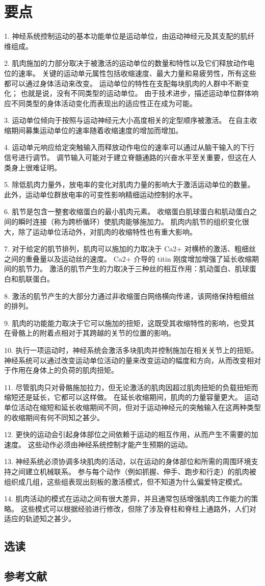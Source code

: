 \section{要点}
1. 神经系统控制运动的基本功能单位是运动单位，由运动神经元及其支配的肌纤维组成。 

2. 肌肉施加的力部分取决于被激活的运动单位的数量和特性以及它们释放动作电位的速率。 关键的运动单元属性包括收缩速度、最大力量和易疲劳性，所有这些都可以通过身体活动来改变。 运动单位的特性在支配每块肌肉的人群中不断变化； 也就是说，没有不同类型的运动单位。 由于技术进步，描述运动单位群体响应不同类型的身体活动变化而表现出的适应性正在成为可能。 

3. 运动单位倾向于按照与运动神经元大小高度相关的定型顺序被激活。 在自主收缩期间募集运动单位的速率随着收缩速度的增加而增加。 

4. 运动单元响应给定突触输入而释放动作电位的速率可以通过从脑干输入的下行信号进行调节。 调节输入可能对于建立脊髓通路的兴奋水平至关重要，但这在人类身上很难证明。 

5. 除低肌肉力量外，放电率的变化对肌肉力量的影响大于激活运动单位的数量。 此外，运动单位群放电率的可变性影响精细运动控制的水平。 

6. 肌节是包含一整套收缩蛋白的最小肌肉元素。 收缩蛋白肌球蛋白和肌动蛋白之间的瞬时连接（称为跨桥循环）使肌肉能够施加力。 肌肉内肌节的组织变化很大，除了运动单位活动外，对肌肉的收缩特性也有重大影响。 

7. 对于给定的肌节排列，肌肉可以施加的力取决于 Ca2+ 对横桥的激活、粗细丝之间的重叠量以及运动丝的速度。 Ca2+ 介导的 titin 刚度增加增强了延长收缩期间的肌节力。 激活的肌节产生的力取决于三种丝的相互作用：肌动蛋白、肌球蛋白和肌联蛋白。 

8. 激活的肌节产生的大部分力通过非收缩蛋白网络横向传递，该网络保持粗细丝的排列。 

9. 肌肉的功能能力取决于它可以施加的扭矩，这既受其收缩特性的影响，也受其在骨骼上的附着点相对于其跨越的关节的位置的影响。 

10. 执行一项运动时，神经系统会激活多块肌肉并控制施加在相关关节上的扭矩。 神经系统可以通过改变运动单位活动的量来改变运动的幅度和方向，从而改变相对于作用在身体上的负荷的肌肉扭矩。 

11. 尽管肌肉只对骨骼施加拉力，但无论激活的肌肉因超过肌肉扭矩的负载扭矩而缩短还是延长，它都可以这样做。 在延长收缩期间，肌肉的力量容量更大。 运动单位活动在缩短和延长收缩期间不同，但对于运动神经元的突触输入在这两种类型的收缩期间有何不同知之甚少。 

12. 更快的运动会引起身体部位之间依赖于运动的相互作用，从而产生不需要的加速度。 这些动作必须由神经系统控制才能产生预期的运动。 

13. 神经系统必须协调多块肌肉的活动，以在运动的身体部位和所需的周围环境支持之间建立机械联系。 参与每个动作（例如抓握、伸手、跑步和行走）的肌肉被组织成几组，这些组表现出刻板的激活模式，但不知道为什么偏爱特定模式。 

14. 肌肉活动的模式在运动之间有很大差异，并且通常包括增强肌肉工作能力的策略。 这些模式可以根据经验进行修改，但除了涉及脊柱和脊柱上通路外，人们对适应的轨迹知之甚少。

\subsection{选读}
\subsection{参考文献}